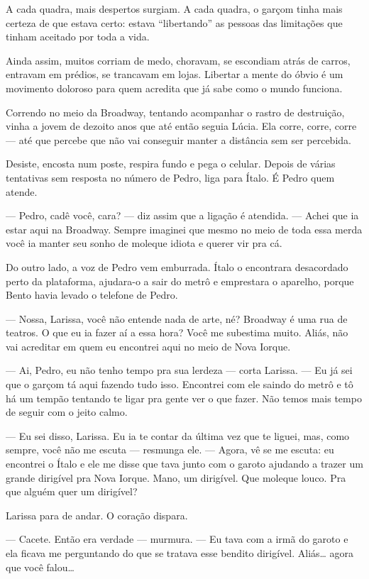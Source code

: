 A cada quadra, mais despertos surgiam.  
A cada quadra, o garçom tinha mais certeza de que estava certo: estava “libertando” as pessoas das limitações que tinham aceitado por toda a vida.

Ainda assim, muitos corriam de medo, choravam, se escondiam atrás de carros, entravam em prédios, se trancavam em lojas.  
Libertar a mente do óbvio é um movimento doloroso para quem acredita que já sabe como o mundo funciona.

\bigskip

Correndo no meio da Broadway, tentando acompanhar o rastro de destruição, vinha a jovem de dezoito anos que até então seguia Lúcia.
Ela corre, corre, corre — até que percebe que não vai conseguir manter a distância sem ser percebida.

Desiste, encosta num poste, respira fundo e pega o celular. Depois de várias tentativas sem resposta no número de Pedro, liga para Ítalo. É Pedro quem atende.

— Pedro, cadê você, cara? — diz assim que a ligação é atendida. — Achei que ia estar aqui na Broadway. Sempre imaginei que mesmo no meio de toda essa merda você ia manter seu sonho de moleque idiota e querer vir pra cá.

Do outro lado, a voz de Pedro vem emburrada. Ítalo o encontrara desacordado perto da plataforma, ajudara-o a sair do metrô e emprestara o aparelho, porque Bento havia levado o telefone de Pedro.

— Nossa, Larissa, você não entende nada de arte, né? Broadway é uma rua de teatros. O que eu ia fazer aí a essa hora? Você me subestima muito.  
Aliás, não vai acreditar em quem eu encontrei aqui no meio de Nova Iorque.

— Ai, Pedro, eu não tenho tempo pra sua lerdeza — corta Larissa. — Eu já sei que o garçom tá aqui fazendo tudo isso. Encontrei com ele saindo do metrô e tô há um tempão tentando te ligar pra gente ver o que fazer.  
Não temos mais tempo de seguir com o jeito calmo.

— Eu sei disso, Larissa. Eu ia te contar da última vez que te liguei, mas, como sempre, você não me escuta — resmunga ele. — Agora, vê se me escuta: eu encontrei o Ítalo e ele me disse que tava junto com o garoto ajudando a trazer um grande dirigível pra Nova Iorque.  
Mano, um dirigível. Que moleque louco. Pra que alguém quer um dirigível?

Larissa para de andar.  
O coração dispara.

— Cacete. Então era verdade — murmura. — Eu tava com a irmã do garoto e ela ficava me perguntando do que se tratava esse bendito dirigível.  
Aliás… agora que você falou…

